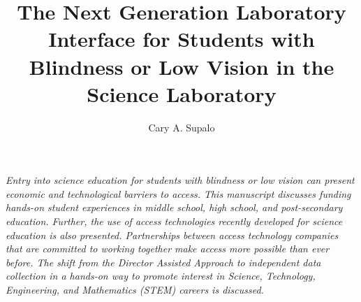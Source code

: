 \documentclass[11.5pt]{sig-alternate} %
\makeatletter
\let\oldabstract\abstract
\let\oldendabstract\endabstract
\renewenvironment{abstract} %
{\renewenvironment{quotation}%
               {\list{}{\addtolength{\leftmargin}{1em} %
                        \listparindent 1.5em%
                        \itemindent    \listparindent%
                        \rightmargin   \leftmargin%
                        \parsep        \z@ \@plus\p@}%
                \item\relax}%
               {\endlist}%
\oldabstract}
{\oldendabstract}
\makeatother
\begin{document}
\title{The Next Generation Laboratory Interface for Students with Blindness or Low Vision in the Science Laboratory}

\author[1]{\large \color{blue}Cary A. Supalo}


\toappear{}
\maketitle
\begin{@twocolumnfalse} 
\begin{abstract}
\item 
\textit{Entry into science education for students with blindness or low vision can present economic and technological barriers to access. This manuscript discusses funding hands-on student experiences in middle school, high school, and post-secondary education. Further, the use of access technologies recently developed for science education is also presented. Partnerships between access technology companies that are committed to working together make access more possible than ever before. The shift from the Director Assisted Approach to independent data collection in a hands-on way to promote interest in Science, Technology, Engineering, and Mathematics (STEM) careers is discussed.}
\\ \\

\end{abstract}
\end{@twocolumnfalse}

\end{document}

